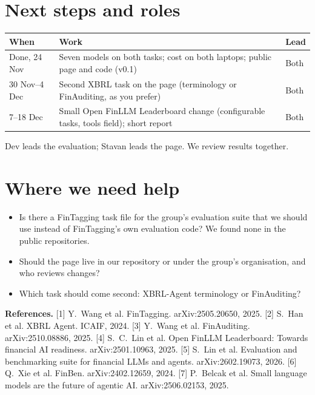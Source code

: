 \documentclass[10pt]{article}
\begin{document}
\section{Next steps and roles}
{\centering\small
\begin{tabular}{p{2.3cm}p{10.4cm}p{2.4cm}}
\toprule
When & Work & Lead \\
\midrule
Done, 24 Nov & Seven models on both tasks; cost on both laptops; public page and code (v0.1) & Both \\
30 Nov--4 Dec & Second XBRL task on the page (terminology or FinAuditing, as you prefer) & Both \\
7--18 Dec & Small Open FinLLM Leaderboard change (configurable tasks, tools field); short report & Both \\
\bottomrule
\end{tabular}\par}
\vspace{3pt}
Dev leads the evaluation; Stavan leads the page. We review results together.

\section{Where we need help}
\begin{itemize}
\item Is there a FinTagging task file for the group's evaluation suite that we should use instead of FinTagging's own
evaluation code? We found none in the public repositories.
\item Should the page live in our repository or under the group's organisation, and who reviews changes?
\item Which task should come second: XBRL-Agent terminology or FinAuditing?
\end{itemize}

\vspace{4pt}
{\footnotesize\textbf{References.}
[1] Y.~Wang et al. FinTagging. arXiv:2505.20650, 2025.
[2] S.~Han et al. XBRL Agent. ICAIF, 2024.
[3] Y.~Wang et al. FinAuditing. arXiv:2510.08886, 2025.
[4] S.~C.~Lin et al. Open FinLLM Leaderboard: Towards financial AI readiness. arXiv:2501.10963, 2025.
[5] S.~Lin et al. Evaluation and benchmarking suite for financial LLMs and agents. arXiv:2602.19073, 2026.
[6] Q.~Xie et al. FinBen. arXiv:2402.12659, 2024.
[7] P.~Belcak et al. Small language models are the future of agentic AI. arXiv:2506.02153, 2025.\par}
\end{document}
